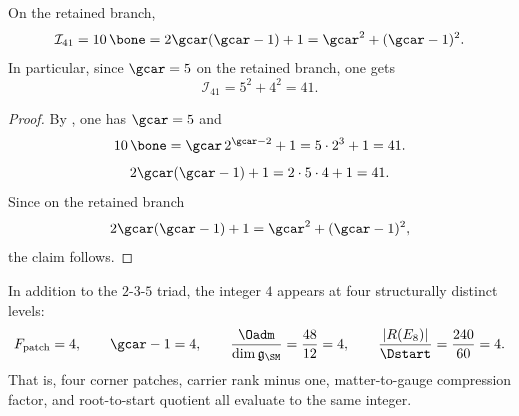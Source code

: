 \begin{corollary}
\label{cor:pythagorean-integrity-index}
On the retained branch,
\[
\mathcal I_{41}
=
10\,\bone
=
2\gcar(\gcar-1)+1
=
\gcar^2+(\gcar-1)^2.
\]
In particular, since $\gcar=5$ on the retained branch, one gets
\[
\mathcal I_{41}=5^2+4^2=41.
\]
\end{corollary}

\begin{proof}
By , one has $\gcar=5$ and
\[
10\,\bone=\gcar\,2^{\gcar-2}+1=5\cdot 2^3+1=41.
\]
\[
2\gcar(\gcar-1)+1=2\cdot 5\cdot 4+1=41.
\]
Since on the retained branch
\[
2\gcar(\gcar-1)+1=\gcar^2+(\gcar-1)^2,
\]
the claim follows.
\end{proof}

\begin{remark}
In addition to the $2$-$3$-$5$ triad, the integer $4$ appears at four structurally distinct levels:
\[
F_{\mathrm{patch}}=4,
\qquad
\gcar-1=4,
\qquad
\frac{\Oadm}{\dim\mathfrak g_{\SM}}=\frac{48}{12}=4,
\qquad
\frac{|R(E_8)|}{\Dstart}=\frac{240}{60}=4.
\]
That is, four corner patches, carrier rank minus one, matter-to-gauge compression factor, and root-to-start quotient all evaluate to the same integer.
\end{remark}

